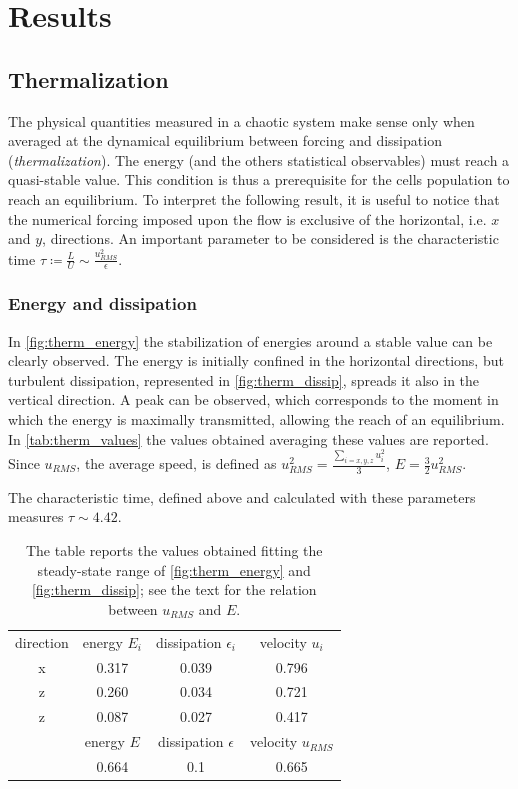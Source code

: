 \section{Results}

\subsection{Thermalization}
The physical quantities measured in a chaotic system make sense only when averaged at the dynamical equilibrium between forcing and dissipation (\textit{thermalization}). The energy (and the others statistical observables) must reach a quasi-stable value. This condition is thus a prerequisite for the cells population to reach an equilibrium. To interpret the following result, it is useful to notice that the numerical forcing imposed upon the flow is exclusive of the horizontal, i.e. $x$ and $y$, directions. An important parameter to be considered is the characteristic time \( \tau \coloneqq \frac{L}{U} \sim \frac{u_{RMS}^2}{\epsilon}\).

\subsubsection{Energy and dissipation}
In \autoref{fig:therm_energy} the stabilization of energies around a stable value can be clearly observed. The energy is initially confined in the horizontal directions, but turbulent dissipation, represented in \autoref{fig:therm_dissip}, spreads it also in the vertical direction. A peak can be observed, which corresponds to the moment in which the energy is maximally transmitted, allowing the reach of an equilibrium.
In \autoref{tab:therm_values} the values obtained averaging these values are reported. Since $u_{RMS}$, the average speed, is defined as \( u_{RMS}^2 = \frac{ \sum_{i={x,y,z}} u_i^2 }{3} \), \(E = \frac{3}{2} u_{RMS}^2 \).

The characteristic time, defined above and calculated with these parameters measures \( \tau \sim 4.42 \).

\begin{table}
\centering
\begin{tabular}{c || c | c | c}
    direction & energy $E_i$ & dissipation $\epsilon_i$ & velocity $u_i$ \\
    x         &  0.317   & 0.039 & 0.796 \\    
    z         &  0.260   & 0.034 & 0.721 \\    
    z         &  0.087   & 0.027 & 0.417 \\    
    \hline
     & energy $E$ & dissipation $\epsilon$ & velocity $u_{RMS}$ \\
              &  0.664   & 0.1   & 0.665 \\    
\end{tabular}
\caption{The table reports the values obtained fitting the steady-state range of \autoref{fig:therm_energy} and \autoref{fig:therm_dissip}; see the text for the relation between $u_{RMS}$ and $E$.}
\label{tab:therm_values}
\end{table}


